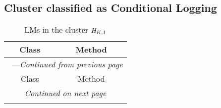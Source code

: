 \subsection{Cluster classified as Conditional Logging}

\begin{center}
\begin{longtable}{ll}
\caption{LMs in the cluster $\mathit{H}_{\mathit{K},1}$}\\
\toprule\multicolumn{1}{c}{Class}&\multicolumn{1}{c}{Method}\\\midrule
\endfirsthead

\multicolumn{2}{c}{\tablename\ \thetable{}---\textit{Continued from previous page}} \\\midrule
\multicolumn{1}{c}{Class}&\multicolumn{1}{c}{Method}\\\midrule
\endhead
\multicolumn{2}{c}{\textit{Continued on next page}}\\\midrule
\endfoot
\bottomrule
\endlastfoot


\end{longtable}
\end{center}
